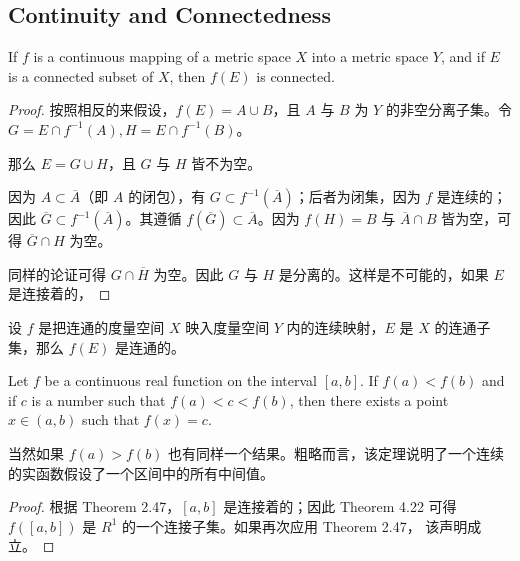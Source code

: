 \documentclass[../poma-notes.tex]{subfiles}
\begin{document}
\subsection*{Continuity and Connectedness}

\begin{theorem}
  If $f$ is a continuous mapping of a metric space $X$ into a metric space $Y$, and if $E$ is a connected subset of
  $X$, then $f(E)$ is connected.
\end{theorem}

\begin{proof}
  按照相反的来假设，$f(E) = A \cup B$，且 $A$ 与 $B$ 为 $Y$ 的非空分离子集。令 $G = E \cap f^{-1}(A),H = E \cap f^{-1}(B)$。

  那么 $E = G \cup H$，且 $G$ 与 $H$ 皆不为空。

  因为 $A \subset \overline{A}$（即 $A$ 的闭包），有 $G \subset f^{-1}(\overline{A})$；后者为闭集，因为 $f$ 是连续的；因此
  $\overline{G} \subset f^{-1}(\overline{A})$。其遵循 $f(\overline{G}) \subset \overline{A}$。因为 $f(H) = B$ 与
  $\overline{A} \cap B$ 皆为空，可得 $\overline{G} \cap H$ 为空。

  同样的论证可得 $G \cap \overline{H}$ 为空。因此 $G$ 与 $H$ 是分离的。这样是不可能的，如果 $E$ 是连接着的，
\end{proof}

\begin{anote}
  设 $f$ 是把连通的度量空间 $X$ 映入度量空间 $Y$ 内的连续映射，$E$ 是 $X$ 的连通子集，那么 $f(E)$ 是连通的。
\end{anote}

\begin{theorem}
  Let $f$ be a continuous real function on the interval $[a, b]$. If $f(a) < f(b)$ and if $c$ is a number such that
  $f(a) < c < f(b)$, then there exists a point $x \in (a,b)$ such that $f(x) = c$.
\end{theorem}

当然如果 $f(a) > f(b)$ 也有同样一个结果。粗略而言，该定理说明了一个连续的实函数假设了一个区间中的所有中间值。

\begin{proof}
  根据 Theorem 2.47，$[a, b]$ 是连接着的；因此 Theorem 4.22 可得 $f([a,b])$ 是 $R^1$ 的一个连接子集。如果再次应用 Theorem 2.47，
  该声明成立。
\end{proof}

\end{document}
